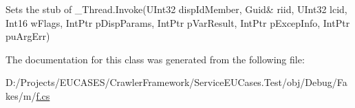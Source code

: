 Sets the stub of \-\_\-\-Thread.\-Invoke(U\-Int32 disp\-Id\-Member, Guid\& riid, U\-Int32 lcid, Int16 w\-Flags, Int\-Ptr p\-Disp\-Params, Int\-Ptr p\-Var\-Result, Int\-Ptr p\-Excep\-Info, Int\-Ptr pu\-Arg\-Err)



The documentation for this class was generated from the following file\-:\begin{DoxyCompactItemize}
\item 
D\-:/\-Projects/\-E\-U\-C\-A\-S\-E\-S/\-Crawler\-Framework/\-Service\-E\-U\-Cases.\-Test/obj/\-Debug/\-Fakes/m/\hyperlink{m_2f_8cs}{f.\-cs}\end{DoxyCompactItemize}
